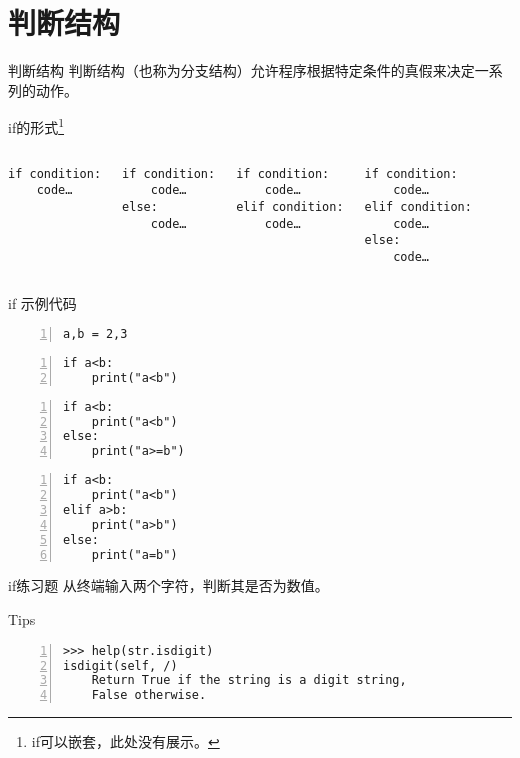 \documentclass{beamer}
\begin{document}
\section{判断结构}
\begin{frame}[fragile]{判断结构}
判断结构（也称为分支结构）允许程序根据特定条件的真假来决定一系列的动作。
\begin{block}{if的形式\footnote{if可以嵌套，此处没有展示。}}
\begin{columns}
\column{2.8cm}
\begin{Verbatim}[numbers=none,frame=single,rulecolor=\color{red}]
if condition:
    code…
\end{Verbatim}
\column{2.8cm}
\begin{Verbatim}[numbers=none,frame=single,rulecolor=\color{red}]
if condition:
    code…
else:
    code…
\end{Verbatim}
\column{3.1cm}
\begin{Verbatim}[numbers=none,frame=single,rulecolor=\color{red}]
if condition:
    code…
elif condition:
    code…
\end{Verbatim}
\column{3.1cm}
\begin{Verbatim}[numbers=none,frame=single,rulecolor=\color{red}]
if condition:
    code…
elif condition:
    code…
else:
    code…
\end{Verbatim}
\end{columns}

\end{block}
\end{frame}
\begin{frame}[fragile]{if 示例代码}
\begin{Verbatim}[numbers=left,frame=single,rulecolor=\color{red}]
a,b = 2,3
\end{Verbatim}
\begin{Verbatim}[numbers=left,frame=single,rulecolor=\color{red}]
if a<b:
    print("a<b")
    \end{Verbatim}
    \begin{Verbatim}[numbers=left,frame=single,rulecolor=\color{red}]
if a<b:
    print("a<b")
else:
    print("a>=b")
    \end{Verbatim}
    \begin{Verbatim}[numbers=left,frame=single,rulecolor=\color{red}]
if a<b:
    print("a<b")
elif a>b:
    print("a>b")
else:
    print("a=b")
\end{Verbatim}

\end{frame}
\begin{frame}[fragile]{if练习题}
从终端输入两个字符，判断其是否为数值。
\begin{block}{Tips}
\begin{Verbatim}[numbers=left,frame=single,rulecolor=\color{red}]
>>> help(str.isdigit)
isdigit(self, /)
    Return True if the string is a digit string, 
    False otherwise.
\end{Verbatim}
\end{block}
\end{frame}
\end{document}
